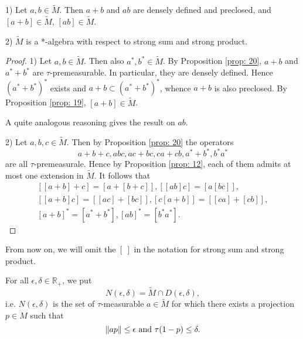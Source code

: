 \begin{proposition}
    1) Let $a,b\in \widetilde{M}$. Then $a+b$ and $ab$ are densely defined and preclosed, and $[a+b]\in \widetilde{M}$, $[ab]\in \widetilde{M}$.\par
    2) $\widetilde{M}$ is a *-algebra with respect to strong sum and strong product.
\end{proposition}
\begin{proof}
    1) Let $a,b\in \widetilde{M}$. Then also  $a^*,b^*\in \widetilde{M}$. By Proposition \ref{prop: 20}, $a+b$ and $a^*+b^*$ are $\tau$-premeasurable. In particular, they are densely defined. Hence $(a^*+b^*)^*$ exists and $a+b\subset (a^*+b^*)^*$, whence $a+b$ is also preclosed. By Proposition \ref{prop: 19},  $[a+b]\in \widetilde{M}$.\par
    A quite analogous reasoning gives the result on $ab$.\par
    2) Let $a,b,c\in \widetilde{M}$. Then by Proposition \ref{prop: 20} the operators
    \[
        a+b+c,abc,ac+bc,ca+cb,a^*+b^*,b^*a^*
    \]
    are all $\tau$-premeasurale. Hence by Proposition \ref{prop: 12}, each of them admits at most one extension in $\widetilde{M}$. It follows that
    \[
        \begin{split}
            [[a+b]+c]=[a+[b+c]],[[ab]c]=[a[bc]],  \\
            [[a+b]c]=[[ac]+[bc]],[c[a+b]]=[[ca]+[cb]],\\
            [a+b]^*=[a^*+b^*],[ab]^*=[b^*a^*].
        \end{split}
    \]
\end{proof}
\begin{notation}
    From now on, we will omit the $[~]$ in the notation for strong sum and strong product.
\end{notation}
\begin{definition}
    For all $\epsilon,\delta\in \mathbb{R}_+$, we put
    \[
        N(\epsilon,\delta)=\widetilde{M}\cap D(\epsilon,\delta),
    \]
    i.e. $N(\epsilon,\delta)$ is the set of $\tau$-measurable $a\in \widetilde{M}$ for which there exists a projection $p\in M$ such that
    \[
        \norm{ap}\leq \epsilon \text{ and } \tau(1-p)\leq \delta.
    \]
\end{definition}
